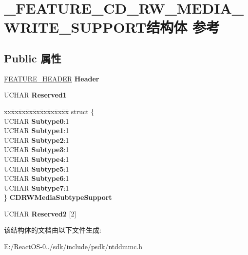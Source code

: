 \hypertarget{struct___f_e_a_t_u_r_e___c_d___r_w___m_e_d_i_a___w_r_i_t_e___s_u_p_p_o_r_t}{}\section{\+\_\+\+F\+E\+A\+T\+U\+R\+E\+\_\+\+C\+D\+\_\+\+R\+W\+\_\+\+M\+E\+D\+I\+A\+\_\+\+W\+R\+I\+T\+E\+\_\+\+S\+U\+P\+P\+O\+R\+T结构体 参考}
\label{struct___f_e_a_t_u_r_e___c_d___r_w___m_e_d_i_a___w_r_i_t_e___s_u_p_p_o_r_t}
\subsection*{Public 属性}
\begin{DoxyCompactItemize}
\item 
\mbox{\label{struct___f_e_a_t_u_r_e___c_d___r_w___m_e_d_i_a___w_r_i_t_e___s_u_p_p_o_r_t_ae9d1b72487960bc2ca31608e29f92842}} 
\hyperlink{struct___f_e_a_t_u_r_e___h_e_a_d_e_r}{F\+E\+A\+T\+U\+R\+E\+\_\+\+H\+E\+A\+D\+ER} {\bfseries Header}
\item 
\mbox{\label{struct___f_e_a_t_u_r_e___c_d___r_w___m_e_d_i_a___w_r_i_t_e___s_u_p_p_o_r_t_a823438ea89bfa4a8c983052afb7b21aa}} 
U\+C\+H\+AR {\bfseries Reserved1}
\item 
\mbox{\label{struct___f_e_a_t_u_r_e___c_d___r_w___m_e_d_i_a___w_r_i_t_e___s_u_p_p_o_r_t_aa4919bf3a9646a980413e4ce464934c4}} 
\begin{tabbing}
xx\=xx\=xx\=xx\=xx\=xx\=xx\=xx\=xx\=\kill
struct \{\\
\>UCHAR {\bfseries Subtype0}:1\\
\>UCHAR {\bfseries Subtype1}:1\\
\>UCHAR {\bfseries Subtype2}:1\\
\>UCHAR {\bfseries Subtype3}:1\\
\>UCHAR {\bfseries Subtype4}:1\\
\>UCHAR {\bfseries Subtype5}:1\\
\>UCHAR {\bfseries Subtype6}:1\\
\>UCHAR {\bfseries Subtype7}:1\\
\} {\bfseries CDRWMediaSubtypeSupport}\\

\end{tabbing}\item 
\mbox{\label{struct___f_e_a_t_u_r_e___c_d___r_w___m_e_d_i_a___w_r_i_t_e___s_u_p_p_o_r_t_a4d94d87e71ba82fd3efbb53e2473976e}} 
U\+C\+H\+AR {\bfseries Reserved2} \mbox{[}2\mbox{]}
\end{DoxyCompactItemize}


该结构体的文档由以下文件生成\+:\begin{DoxyCompactItemize}
\item 
E\+:/\+React\+O\+S-\/0../sdk/include/psdk/ntddmmc.\+h\end{DoxyCompactItemize}
